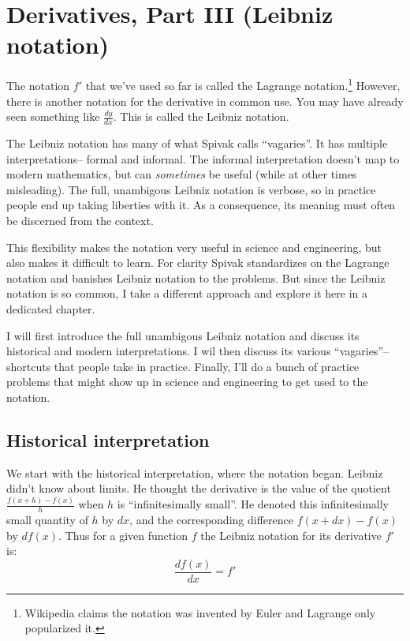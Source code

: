 
\section{Derivatives, Part III (Leibniz notation)}

The notation $f'$ that we've used so far is called the Lagrange
notation.\footnote{Wikipedia claims the notation was invented by Euler
  and Lagrange only popularized it.} However, there is another
notation for the derivative in common use. You may have already seen
something like $\frac{dy}{dx}$. This is called the Leibniz notation.

\vs

The Leibniz notation has many of what Spivak calls ``vagaries''. It
has multiple interpretations-- formal and informal. The informal
interpretation doesn't map to modern mathematics, but can
\textit{sometimes} be useful (while at other times misleading). The
full, unambigous Leibniz notation is verbose, so in practice people
end up taking liberties with it. As a consequence, its meaning must
often be discerned from the context.

\vs

This flexibility makes the notation very useful in science and
engineering, but also makes it difficult to learn. For clarity Spivak
standardizes on the Lagrange notation and banishes Leibniz notation to
the problems. But since the Leibniz notation is so common, I take a
different approach and explore it here in a dedicated chapter.

\vs

I will first introduce the full unambigous Leibniz notation and
discuss its historical and modern interpretations. I wil then discuss
its various ``vagaries''-- shortcuts that people take in practice.
Finally, I'll do a bunch of practice problems that might show up in
science and engineering to get used to the notation.

\subsection{Historical interpretation}

We start with the historical interpretation, where the notation began.
Leibniz didn't know about limits. He thought the derivative is the
value of the quotient $\frac{f(x+h)-f(x)}{h}$ when $h$ is
``infinitesimally small''. He denoted this infinitesimally small
quantity of $h$ by $dx$, and the corresponding difference
$f(x+dx)-f(x)$ by $df(x)$. Thus for a given function $f$ the Leibniz
notation for its derivative $f'$ is:
\[\frac{df(x)}{dx}=f'\]

